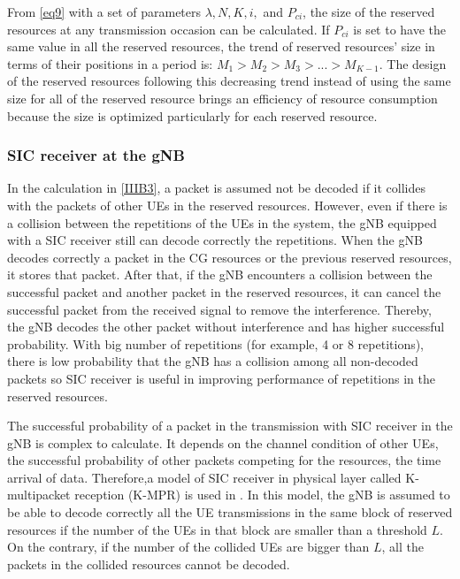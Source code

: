 \documentclass{ieeeaccess}
\begin{document}
From \eqref{eq9} with a set of parameters  $\lambda, N, K, i,$ and $P_{ci}$, the size of the reserved resources at any transmission occasion can be calculated. If $P_{ci}$ is set to have the same value in all the reserved resources, the trend of reserved resources' size in terms of their positions in a period is: $M_1 > M_2 > M_3 > ... > M_{K-1}$. The design of the reserved resources following this decreasing trend instead of using the same size for all of the reserved resource brings an efficiency of resource consumption because the size is optimized particularly for each reserved resource.

\subsubsection{SIC receiver at the gNB}

In the calculation in \ref{IIIB3}, a packet is assumed not be decoded if it collides with the packets of other UEs in the reserved resources. However, even if there is a collision between the repetitions of the UEs in the system, the gNB equipped with a SIC receiver still can decode correctly the repetitions. When the gNB decodes correctly a packet in the CG resources or the previous reserved resources, it stores that packet. After that, if the gNB encounters a collision between the successful packet and another packet in the reserved resources, it can cancel the successful packet from the received signal to remove the interference. Thereby, the gNB decodes the other packet without interference and has higher successful probability. With big number of repetitions (for example, 4 or  8 repetitions), there is low probability that the gNB has a collision among all non-decoded packets so SIC receiver is useful in improving performance of repetitions in the reserved resources.

The successful probability of a packet in the transmission with SIC receiver in the gNB is complex to calculate. It depends on the channel condition of other UEs, the successful probability of other packets competing for the resources, the time arrival of data. Therefore,a model of SIC receiver in physical layer called K-multipacket reception (K-MPR) is used in \cite{ref21}. In this model, the gNB is assumed to be able to decode correctly all the UE transmissions in the same block of reserved resources if the number of the UEs in that block are smaller than a threshold $L$. On the contrary, if the number of the collided UEs are bigger than $L$, all the packets in the collided resources cannot be decoded.
\end{document}
